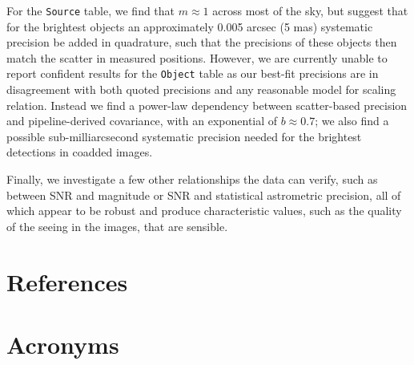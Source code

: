 \documentclass[SE,lsstdraft,authoryear,toc]{lsstdoc}
\begin{document}
For the \texttt{Source} table, we find that $m \approx 1$ across most of the sky, but suggest that for the brightest objects an approximately 0.005 arcsec (5 mas) systematic precision be added in quadrature, such that the precisions of these objects then match the scatter in measured positions.
However, we are currently unable to report confident results for the \texttt{Object} table as our best-fit precisions are in disagreement with both quoted precisions and any reasonable model for scaling relation.
Instead we find a power-law dependency between scatter-based precision and pipeline-derived covariance, with an exponential of $b \approx 0.7$; we also find a possible sub-milliarcsecond systematic precision needed for the brightest detections in coadded images.

Finally, we investigate a few other relationships the data can verify, such as between SNR and magnitude or SNR and statistical astrometric precision, all of which appear to be robust and produce characteristic values, such as the quality of the seeing in the images, that are sensible.

\appendix
\section{References} \label{sec:bib}
\renewcommand{\refname}{} %


\section{Acronyms} \label{sec:acronyms}

\end{document}
